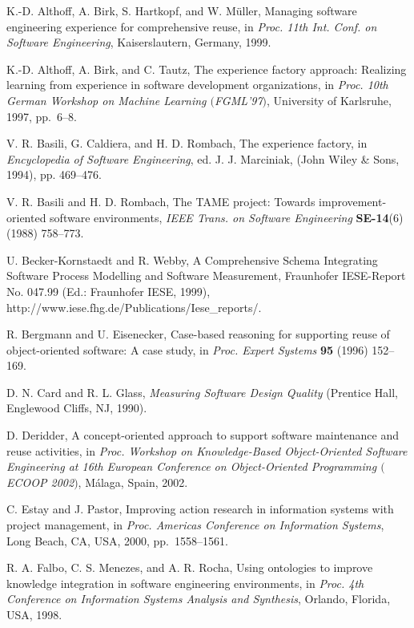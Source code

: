 \documentclass{ws-ijsc}
\begin{document}
\begin{thebibliography}{00}

 K.-D. Althoff, A. Birk, S. Hartkopf, and W. M\"{u}ller,
Managing software engineering experience for comprehensive reuse, in
{\it Proc.  11th Int. Conf. on Software Engineering}, Kaiserslautern,
Germany, 1999.

 K.-D. Althoff, A. Birk, and C. Tautz, The experience 
factory approach: Realizing learning from experience in software 
development organizations, in {\it Proc. 10th German Workshop 
on Machine Learning $($FGML'97$)$}, University of Karlsruhe, 1997, 
pp.~6--8.

 V. R. Basili, G. Caldiera, and H. D. Rombach, The
experience factory, in \textit{Encyclopedia of Software Engineering},
ed. J. J. Marciniak,  (John Wiley \& Sons, 1994), pp. 469--476.

 V. R. Basili and H. D. Rombach, The TAME project: Towards
improvement-oriented software environments, \textit{IEEE Trans.  on
Software Engineering} {\bf SE-14}(6) (1988) 758--773.

 U. Becker-Kornstaedt and R. Webby, A Comprehensive Schema 
Integrating Software Process Modelling and Software Measurement, 
Fraunhofer IESE-Report No. 047.99 (Ed.: Fraunhofer IESE, 1999), 
http://www.iese.fhg.de/Publications/Iese{\_}reports/.

 R. Bergmann and U. Eisenecker, Case-based reasoning for
supporting reuse of object-oriented software: A case study, in {\it
Proc.  Expert Systems} {\bf 95} (1996) 152--169.

 D. N. Card and R. L. Glass, \textit{Measuring Software
Design Quality} (Prentice Hall, Englewood Cliffs, NJ, 1990).

 D. Deridder, A concept-oriented approach to support software 
maintenance and reuse activities, in {\it Proc. Workshop on 
Knowledge-Based Object-Oriented Software Engineering at 16th European 
Conference on Object-Oriented Programming $($ECOOP 2002$)$}, M\'{a}laga, 
Spain, 2002.

 C. Estay and J. Pastor, Improving action research in
information systems with project management, in {\it Proc. Americas
Conference on Information Systems}, Long Beach, CA, USA, 2000,
pp.~1558--1561.

 R. A. Falbo, C. S. Menezes, and A. R. Rocha, Using
ontologies to improve knowledge integration in software engineering
environments, in {\it Proc. 4th Conference on Information Systems
Analysis and Synthesis}, Orlando, Florida, USA, 1998.
\end{thebibliography}
\end{document}
